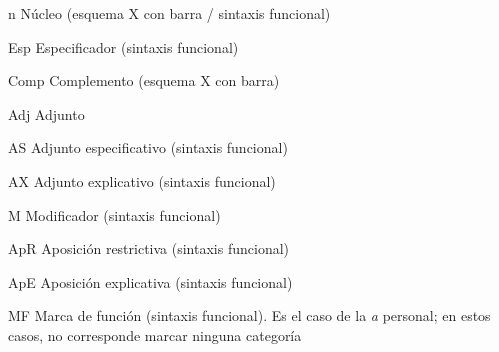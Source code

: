 
\begin{siglario}
  \item[n] Núcleo (esquema X con barra / sintaxis funcional)
  \item[Esp] Especificador (sintaxis funcional)
  \item[Comp] Complemento (esquema X con barra)
  \item[Adj] Adjunto
  \item[AS] Adjunto especificativo (sintaxis funcional)
  \item[AX] Adjunto explicativo (sintaxis funcional)
  \item[M] Modificador (sintaxis funcional)
  \item[ApR] Aposición restrictiva (sintaxis funcional)
  \item[ApE] Aposición explicativa (sintaxis funcional)
  \item[MF] Marca de función (sintaxis funcional). Es el caso de la \textit{a}
        personal; en estos casos, no corresponde marcar ninguna categoría
\end{siglario}

